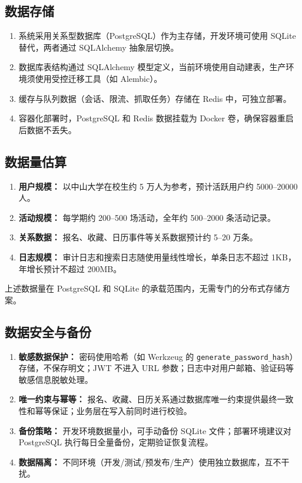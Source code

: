 \documentclass[12pt,a4paper]{ctexart}
\begin{document}
  \subsection{数据存储}
  \begin{enumerate}
  \item 系统采用关系型数据库（PostgreSQL）作为主存储，开发环境可使用 SQLite 替代，两者通过 SQLAlchemy 抽象层切换。
  \item 数据库表结构通过 SQLAlchemy 模型定义，当前环境使用自动建表，生产环境须使用受控迁移工具（如 Alembic）。
  \item 缓存与队列数据（会话、限流、抓取任务）存储在 Redis 中，可独立部署。
  \item 容器化部署时，PostgreSQL 和 Redis 数据挂载为 Docker 卷，确保容器重启后数据不丢失。
  \end{enumerate}

  \subsection{数据量估算}
  \begin{enumerate}
  \item \textbf{用户规模：} 以中山大学在校生约 5 万人为参考，预计活跃用户约 5000--20000 人。
  \item \textbf{活动规模：} 每学期约 200--500 场活动，全年约 500--2000 条活动记录。
  \item \textbf{关系数据：} 报名、收藏、日历事件等关系数据预计约 5--20 万条。
  \item \textbf{日志规模：} 审计日志和搜索日志随使用量线性增长，单条日志不超过 1KB，年增长预计不超过 200MB。
  \end{enumerate}
  上述数据量在 PostgreSQL 和 SQLite 的承载范围内，无需专门的分布式存储方案。

  \subsection{数据安全与备份}
  \begin{enumerate}
  \item \textbf{敏感数据保护：} 密码使用哈希（如 Werkzeug 的 \texttt{generate\_password\_hash}）存储，不保存明文；JWT 不进入 URL 参数；日志中对用户邮箱、验证码等敏感信息脱敏处理。
  \item \textbf{唯一约束与幂等：} 报名、收藏、日历关系通过数据库唯一约束提供最终一致性和幂等保证；业务层在写入前同时进行校验。
  \item \textbf{备份策略：} 开发环境数据量小，可手动备份 SQLite 文件；部署环境建议对 PostgreSQL 执行每日全量备份，定期验证恢复流程。
  \item \textbf{数据隔离：} 不同环境（开发/测试/预发布/生产）使用独立数据库，互不干扰。
  \end{enumerate}
\end{document}
